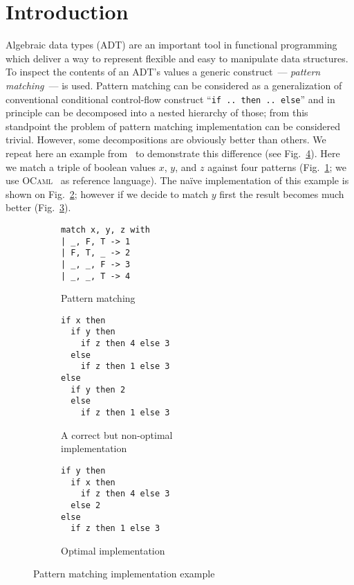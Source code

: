 \section{Introduction}
\label{sec:intro}

Algebraic data types (ADT) are an important tool in functional programming which deliver a way to represent flexible and easy to manipulate data structures.
To inspect the contents of an ADT's values a generic construct~--- \emph{pattern matching}~--- is used. Pattern matching can be considered as a generalization of
conventional conditional control-flow construct ``\lstinline|if .. then .. else|'' and in principle can be decomposed into a nested hierarchy of those; from
this standpoint the problem of pattern matching implementation can be considered trivial. However, some decompositions are obviously better than others. We
repeat here an example from~\cite{maranget2008} to demonstrate this difference (see Fig.~\ref{fig:match-example}). Here we match a triple of boolean
values $x$, $y$, and $z$ against four patterns (Fig.~\ref{fig:matching-example1}; we use \textsc{OCaml}~\cite{ocaml} as reference language). The na\"{i}ve
implementation of this example is shown on Fig.~\ref{fig:matching-example2}; however if we decide to match $y$ first the result becomes much
better (Fig.~\ref{fig:matching-example3}).

\begin{figure}[ht]
\begin{subfigure}[t]{0.2\linewidth}
\centering
\begin{lstlisting}
match x, y, z with
| _, F, T -> 1
| F, T, _ -> 2
| _, _, F -> 3
| _, _, T -> 4
\end{lstlisting}
\vskip18.5mm
\caption{Pattern matching}
\label{fig:matching-example1}
\end{subfigure}
\hspace{0.5cm}
\begin{subfigure}[t]{0.26\linewidth}
\centering
\begin{lstlisting}
if x then
  if y then
    if z then 4 else 3
  else
    if z then 1 else 3
else
  if y then 2
  else
    if z then 1 else 3
\end{lstlisting}
\caption{A correct but non-optimal\\\phantom{(b)~}implementation}
\label{fig:matching-example2}
\end{subfigure}
\hspace{0.5cm}
\begin{subfigure}[t]{0.33\linewidth}
\centering
\begin{lstlisting}
if y then
  if x then
    if z then 4 else 3
  else 2
else
  if z then 1 else 3
\end{lstlisting}
\vskip13.5mm
\caption{Optimal implementation}
\label{fig:matching-example3}
\end{subfigure}
\caption{Pattern matching implementation example} 
\label{fig:match-example}
\end{figure}

